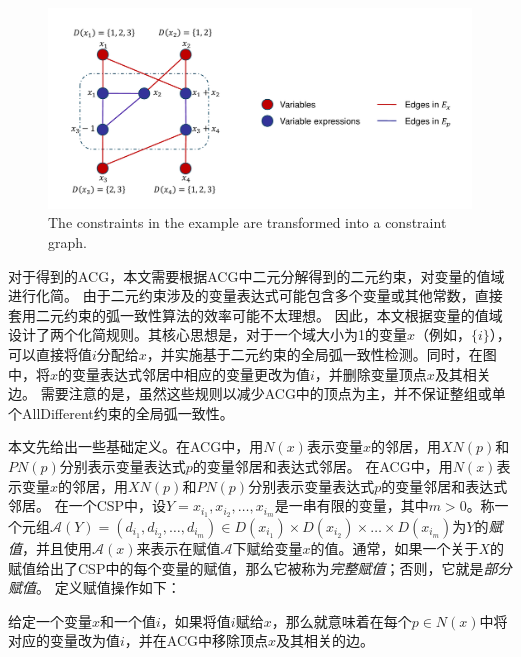 \begin{figure}[]
    \centering
    \includegraphics[width=\columnwidth]{Img/acg.pdf}
     {The constraints in the example are transformed into a constraint graph.}
    \label{fig:acg}
\end{figure}

对于得到的ACG，本文需要根据ACG中二元分解得到的二元约束，对变量的值域进行化简。
由于二元约束涉及的变量表达式可能包含多个变量或其他常数，直接套用二元约束的弧一致性算法的效率可能不太理想。
因此，本文根据变量的值域设计了两个化简规则。其核心思想是，对于一个域大小为1的变量$x$（例如，$\{i\}$），可以直接将值$i$分配给$x$，并实施基于二元约束的全局弧一致性检测。同时，在图中，将$x$的变量表达式邻居中相应的变量更改为值$i$，并删除变量顶点$x$及其相关边。
需要注意的是，虽然这些规则以减少ACG中的顶点为主，并不保证整组或单个AllDifferent约束的全局弧一致性。

本文先给出一些基础定义。在ACG中，用$N(x)$表示变量$x$的邻居，用$XN(p)$和$PN(p)$分别表示变量表达式$p$的变量邻居和表达式邻居。
在ACG中，用$N(x)$表示变量$x$的邻居，用$XN(p)$和$PN(p)$分别表示变量表达式$p$的变量邻居和表达式邻居。
在一个CSP中，设$Y = x_{i_1}, x_{i_2}, \dots , x_{i_m}$是一串有限的变量，其中$m > 0$。称一个元组$\mathcal{A}(Y) = (d_{i_1}, d_{i_2}, \dots , d_{i_m}) \in D(x_{i_1}) \times D(x_{i_2}) \times \dots \times D(x_{i_m})$为$Y$的\textit{赋值}，并且使用$\mathcal{A}(x)$来表示在赋值$\mathcal{A}$下赋给变量$x$的值。通常，如果一个关于$X$的赋值给出了CSP中的每个变量的赋值，那么它被称为{\it 完整赋值}；否则，它就是{\it 部分赋值}。
定义赋值操作如下：
\begin{definition}
    给定一个变量$x$和一个值$i$，如果将值$i$赋给$x$，那么就意味着在每个$p \in N(x)$中将对应的变量改为值$i$，并在ACG中移除顶点$x$及其相关的边。
\end{definition}

